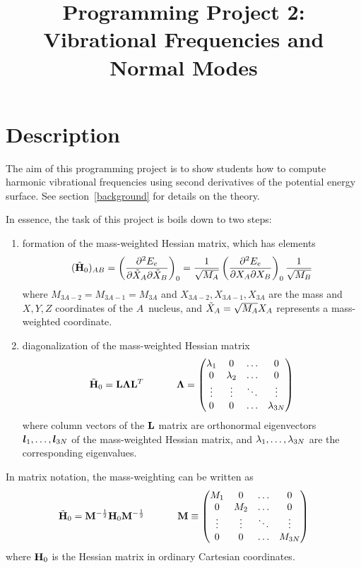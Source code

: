 \documentclass[11pt]{article}
\title{Programming Project 2: Vibrational Frequencies and Normal Modes}
\author{}
\date{}
\begin{document}
\maketitle

\section*{Description}
The aim of this programming project is to show students how to compute harmonic vibrational frequencies using second derivatives of the potential energy surface.
See section~\ref{background} for details on the theory.

In essence, the task of this project is boils down to two steps:
\begin{enumerate}
	\item formation of the mass-weighted Hessian matrix, which has elements
	\begin{align}
		(\tilde{\mathbf{H}}_0)_{AB}
	=
		\left(\dfrac{\partial^2E_e}{\partial\tilde{X}_A\partial\tilde{X}_B}\right)_0
	=
		\dfrac{1}{\sqrt{M_A}}
		\left(\dfrac{\partial^2E_e}{\partial X_A\partial X_B}\right)_0
		\dfrac{1}{\sqrt{M_B}}
	\end{align}
	where $M_{3A-2}=M_{3A-1}=M_{3A}$ and $X_{3A-2}, X_{3A-1}, X_{3A}$ are the mass and $X,Y,Z$ coordinates of the $A$\eth\ nucleus, and $\tilde{X}_A=\sqrt{M_A}X_A$ represents a mass-weighted coordinate.
	\item diagonalization of the mass-weighted Hessian matrix
	\begin{align}
		\tilde{\mathbf{H}}_0
	=
		\mathbf{L}
		\bm{\Lambda}
		\mathbf{L}^T
	\ \ \ \ \ \ \ \ \ \ 
		\bm{\Lambda}
	=
		\left(\begin{matrix}\lambda_1&0&\ldots&0\\
			0&\lambda_2&\ldots&0\\
			\vdots&\vdots&\ddots&\vdots\\
			0&0&\ldots&\lambda_{3N}\end{matrix}\right)
	\end{align}
where column vectors of the $\mathbf{L}$ matrix are orthonormal eigenvectors $\bm{l}_1,\ldots,\bm{l}_{3N}$ of the mass-weighted Hessian matrix, and $\lambda_1,\ldots,\lambda_{3N}$ are the corresponding eigenvalues.
\end{enumerate}
In matrix notation, the mass-weighting can be written as
\begin{align}
%
	\tl{\bo{H}}_0
=
	\bo{M}^{-\frac{1}{2}}
	\bo{H}_0
	\bo{M}^{-\frac{1}{2}}
\sp
	\bo{M}
\equiv
	\ma{M_1&0&\ld&0\\
		0&M_2&\ld&0\\
		\vd&\vd&\dd&\vd\\
		0&0&\ld&M_{3N}}
\end{align}
where $\mathbf{H}_0$ is the Hessian matrix in ordinary Cartesian coordinates.
\end{document}
